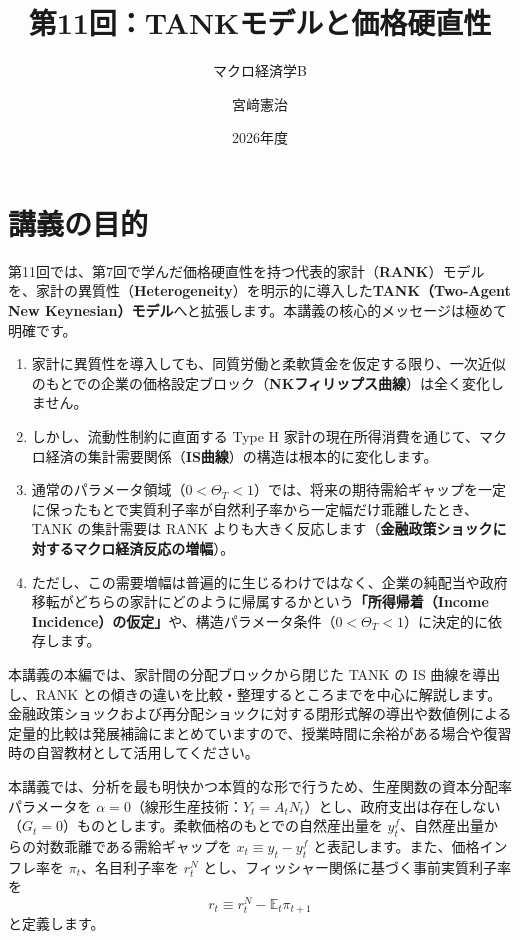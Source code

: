 \documentclass[
  japanese,
  lualatex,
  ja=standard,
  12pt,
  a4paper]{ltjsarticle}
\title{第11回：TANKモデルと価格硬直性}
\subtitle{マクロ経済学B}
\author{宮﨑憲治}
\date{2026年度}
\providecommand{\tightlist}{%
  \setlength{\itemsep}{0pt}\setlength{\parskip}{0pt}}
\renewcommand*\contentsname{目次}
\newcommand\contentsname{目次}
\begin{document}
\maketitle

\renewcommand*\contentsname{目次}
{
\setcounter{tocdepth}{3}
\tableofcontents
}

\section{講義の目的}\label{ux8b1bux7fa9ux306eux76eeux7684}

第11回では、第7回で学んだ価格硬直性を持つ代表的家計（\textbf{RANK}）モデルを、家計の異質性（\textbf{Heterogeneity}）を明示的に導入した\textbf{TANK（Two-Agent
New
Keynesian）モデル}へと拡張します。本講義の核心的メッセージは極めて明確です。

\begin{enumerate}
\def\labelenumi{\arabic{enumi}.}
\tightlist
\item
  家計に異質性を導入しても、同質労働と柔軟賃金を仮定する限り、一次近似のもとでの企業の価格設定ブロック（\textbf{NKフィリップス曲線}）は全く変化しません。
\item
  しかし、流動性制約に直面する Type H
  家計の現在所得消費を通じて、マクロ経済の集計需要関係（\textbf{IS曲線}）の構造は根本的に変化します。
\item
  通常のパラメータ領域（\(0<\Theta_T<1\)）では、将来の期待需給ギャップを一定に保ったもとで実質利子率が自然利子率から一定幅だけ乖離したとき、TANK
  の集計需要は RANK
  よりも大きく反応します（\textbf{金融政策ショックに対するマクロ経済反応の増幅}）。
\item
  ただし、この需要増幅は普遍的に生じるわけではなく、企業の純配当や政府移転がどちらの家計にどのように帰属するかという\textbf{「所得帰着（Income
  Incidence）の仮定」}や、構造パラメータ条件（\(0<\Theta_T<1\)）に決定的に依存します。
\end{enumerate}

本講義の本編では、家計間の分配ブロックから閉じた TANK の IS
曲線を導出し、RANK
との傾きの違いを比較・整理するところまでを中心に解説します。金融政策ショックおよび再分配ショックに対する閉形式解の導出や数値例による定量的比較は発展補論にまとめていますので、授業時間に余裕がある場合や復習時の自習教材として活用してください。

本講義では、分析を最も明快かつ本質的な形で行うため、生産関数の資本分配率パラメータを
\(\alpha=0\)（線形生産技術：\(Y_t=A_t N_t\)）とし、政府支出は存在しない（\(G_t=0\)）ものとします。柔軟価格のもとでの自然産出量を
\(y_t^f\)、自然産出量からの対数乖離である需給ギャップを
\(x_t \equiv y_t - y_t^f\) と表記します。また、価格インフレ率を
\(\pi_t\)、名目利子率を \(r_t^N\)
とし、フィッシャー関係に基づく事前実質利子率を \[
r_t \equiv r_t^N - \mathbb{E}_t \pi_{t+1}
\] と定義します。
\end{document}
